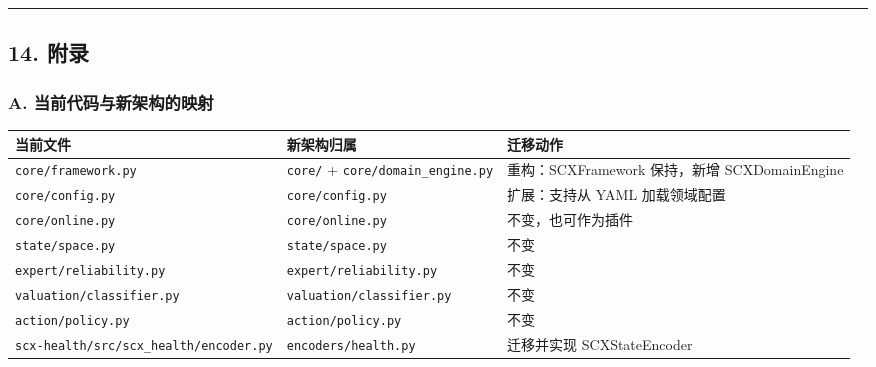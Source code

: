\documentclass[
  12pt,
]{ctexart}
\begin{document}
\begin{center}\rule{0.5\linewidth}{0.5pt}\end{center}

\subsection{14. 附录}\label{ux9644ux5f55}

\subsubsection{A.
当前代码与新架构的映射}\label{a.-ux5f53ux524dux4ee3ux7801ux4e0eux65b0ux67b6ux6784ux7684ux6620ux5c04}

\begin{longtable}[]{@{}
  >{\raggedright\arraybackslash}p{}
  >{\raggedright\arraybackslash}p{}
  >{\raggedright\arraybackslash}p{}@{}}
\toprule\noalign{}
\begin{minipage}[b]{\linewidth}\raggedright
当前文件
\end{minipage} & \begin{minipage}[b]{\linewidth}\raggedright
新架构归属
\end{minipage} & \begin{minipage}[b]{\linewidth}\raggedright
迁移动作
\end{minipage} \\
\midrule\noalign{}
\endhead
\bottomrule\noalign{}
\endlastfoot
\texttt{core/framework.py} & \texttt{core/} +
\texttt{core/domain\_engine.py} & 重构：SCXFramework 保持，新增
SCXDomainEngine \\
\texttt{core/config.py} & \texttt{core/config.py} & 扩展：支持从 YAML
加载领域配置 \\
\texttt{core/online.py} & \texttt{core/online.py} &
不变，也可作为插件 \\
\texttt{state/space.py} & \texttt{state/space.py} & 不变 \\
\texttt{expert/reliability.py} & \texttt{expert/reliability.py} &
不变 \\
\texttt{valuation/classifier.py} & \texttt{valuation/classifier.py} &
不变 \\
\texttt{action/policy.py} & \texttt{action/policy.py} & 不变 \\
\texttt{scx-health/src/scx\_health/encoder.py} &
\texttt{encoders/health.py} & 迁移并实现 SCXStateEncoder \\

\end{longtable}
\end{document}
